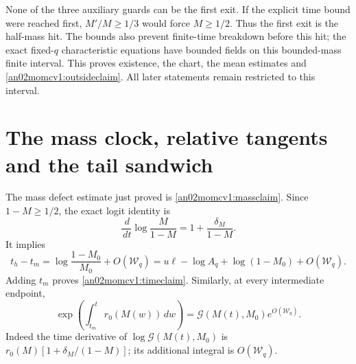 \documentclass[11pt]{article}
\theoremstyle{remark}\newtheorem{remark}[theorem]{Remark}
\newcommand{\dd}{\,d}
\begin{document}
None of the three auxiliary guards can be the first exit.
If the explicit time bound were reached first, $M'/M\ge1/3$
would force $M\ge1/2$. Thus the first exit is the half-mass hit.
The bounds also prevent finite-time breakdown before this hit;
the exact fixed-$q$ characteristic equations have bounded fields
on this bounded-mass finite interval. This proves existence,
the chart, the mean estimates and \eqref{an02momcv1:outsideclaim}.
All later statements remain restricted to this interval.

\section{The mass clock, relative tangents and the tail sandwich}
The mass defect estimate just proved is \eqref{an02momcv1:massclaim}.
Since $1-M\ge1/2$, the exact logit identity is
\[
 \frac{\dd}{\dd t}\log\frac{M}{1-M}
 =1+\frac{\delta_M}{1-M}.
\]
It implies
\begin{equation}\label{an02momcv1:duration}
 t_h-t_m=\log\frac{1-M_0}{M_0}+O(\mathcal W_q)
 =u\ell-\log A_q+\log(1-M_0)+O(\mathcal W_q).
\end{equation}
Adding $t_m$ proves \eqref{an02momcv1:timeclaim}.
Similarly, at every intermediate endpoint,
\begin{equation}\label{an02momcv1:clockconvert}
 \exp\!\left(\int_{t_m}^{t}r_0(M(w))\dd w\right)
 =\mathcal G(M(t),M_0)e^{O(\mathcal W_q)}.
\end{equation}
Indeed the time derivative of $\log\mathcal G(M(t),M_0)$ is
$r_0(M)[1+\delta_M/(1-M)]$; its additional integral is
$O(\mathcal W_q)$.
\end{document}
